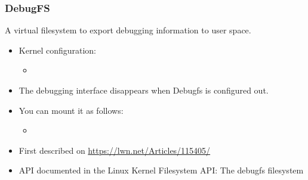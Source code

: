\begin{frame}
  \frametitle{DebugFS}
  A virtual filesystem to export debugging information to user space.
  \begin{itemize}
  \item Kernel configuration: 
    \begin{itemize}
    \item {}
    \end{itemize}
  \item The debugging interface disappears when Debugfs is
    configured out.
  \item You can mount it as follows:
    \begin{itemize}
    \item {}
    \end{itemize}
  \item First described on \url{https://lwn.net/Articles/115405/}
  \item API documented in the Linux Kernel Filesystem API:
    {The debugfs filesystem}
  \end{itemize}
\end{frame}

